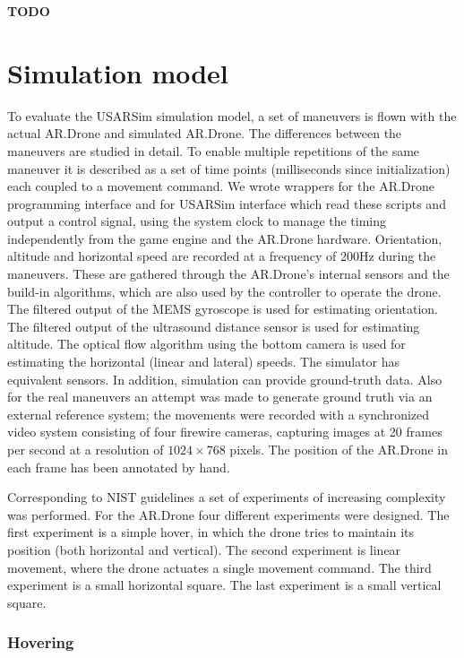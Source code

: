 \textbf{TODO}

	\section{Simulation model}
\label{sec:simulation_results}
To evaluate the USARSim simulation model,  
a set of maneuvers is flown with the actual AR.Drone and
simulated AR.Drone. The differences between the maneuvers are studied in detail. To enable multiple repetitions of the same maneuver it is
described as a set of time points (milliseconds since initialization) each coupled to a movement command.
We wrote wrappers for the AR.Drone programming interface and for USARSim interface which read these scripts and output a control
signal, using the system clock to manage the timing independently from the game engine and the AR.Drone hardware.
Orientation, altitude and horizontal speed are recorded at a frequency of 200Hz during the maneuvers. These are gathered through the AR.Drone's internal sensors and the build-in algorithms, which are
also used by the controller to operate the drone. The filtered output of the MEMS gyroscope is used
for estimating orientation. The filtered output of the ultrasound distance sensor is used for estimating
altitude. The optical 
flow algorithm using the bottom camera is used for estimating the horizontal (linear
and lateral) speeds. The simulator has equivalent sensors. In addition, simulation can provide ground-truth data. 
Also for the real maneuvers an attempt was made to generate ground truth via an external reference system; the movements were recorded with a synchronized video system consisting of four firewire cameras, capturing images at 20 frames per second at a resolution of $1024 \times 768$ pixels. The position of the AR.Drone 
in each frame has been annotated by hand. 

Corresponding to NIST guidelines \cite{Jacoff2010STM}
a set of experiments of increasing complexity was performed. For the AR.Drone
four different experiments were designed.
The first experiment is a simple hover, in which the drone tries to maintain its position (both horizontal and vertical). The second experiment is linear movement, where the drone actuates a single movement command. The third experiment is a small horizontal square. The last experiment is a small vertical square.

\subsubsection{Hovering}

